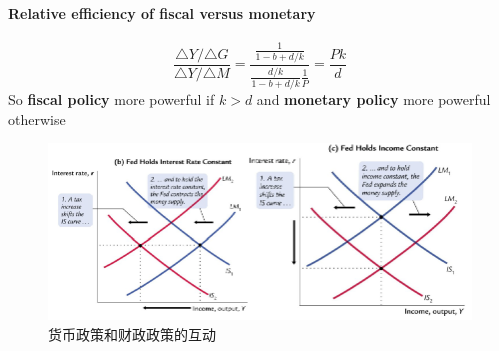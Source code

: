 \documentclass[UTF8, onecolumn, a4paper, 12pt]{article}
\begin{document}
\paragraph{Relative efficiency of fiscal versus monetary}
$$\frac{\triangle Y/\triangle G}{\triangle Y/\triangle M} = \frac{\frac{1}{1-b+d/k}}{\frac{d/k}{1-b+d/k}\frac{1}{P}} = \frac{Pk}{d}$$
So \textbf{fiscal policy} more powerful if $k > d$ and \textbf{monetary policy} more powerful otherwise
\begin{figure}[htb]
	\centering
	\includegraphics[width=0.6\linewidth]{fed}
	\caption{货币政策和财政政策的互动}
\end{figure}
\end{document}
